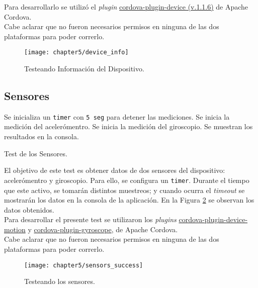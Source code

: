 Para desarrollarlo se utilizó el \textit{plugin} \href{https://www.npmjs.com/package/cordova-plugin-device}{cordova-plugin-device (v.1.1.6)} de Apache Cordova.\\

Cabe aclarar que no fueron necesarios permisos en ninguna de las dos plataformas para poder correrlo.
\begin{figure}[hbtp]
   \centering
	\texttt{[image: chapter5/device\_info]}
	\caption{Testeando Información del Dispositivo.}
	\label{fig:ch05:device-info}
\end{figure}
\newpage
\subsection{Sensores}
\begin{algorithm}
	\begin{algorithmic}[1]
		\STATE Se inicializa un \texttt{timer} con \texttt{5 seg} para detener las mediciones.
		\STATE Se inicia la medición del acelerómentro.
		\STATE Se inicia la medición del giroscopio.
		\STATE Se muestran los resultados en la consola.
	\end{algorithmic}
	\caption{Test de los Sensores.}\label{alg:chap5_test_sensors}
\end{algorithm}
El objetivo de este test es obtener datos de dos sensores del dispositivo: acelerómentro y giroscopio. Para ello, se configura un \texttt{timer}. Durante el tiempo que este activo, se tomarán distintos muestreos; y cuando ocurra el \emph{timeout} se mostrarán los datos en la consola de la aplicación. En la Figura \ref{fig:ch05:sensors_test} se observan los datos obtenidos.\\

Para desarrollar el presente test se utilizaron los \textit{plugins} \href{https://www.npmjs.com/package/cordova-plugin-device-motion}{cordova-plugin-device-motion} y \href{https://www.npmjs.com/package/cordova-plugin-gyroscope}{cordova-plugin-gyroscope}, de Apache Cordova.\\

Cabe aclarar que no fueron necesarios permisos en ninguna de las dos plataformas para poder correrlo.
\begin{figure}[hbp]
    \centering
	\texttt{[image: chapter5/sensors\_success]}
	\caption{Testeando los sensores.}
	\label{fig:ch05:sensors_test}
\end{figure}

